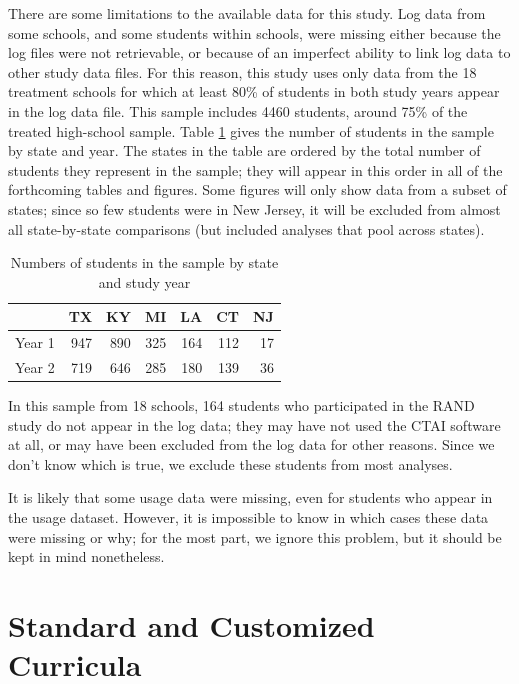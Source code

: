 \documentclass[12pt]{article}\usepackage[]{graphicx}\usepackage[]{color}
\begin{document}
There are some limitations to the available data for this study.
Log data from some schools, and some students within schools, were
missing either because the log files were not retrievable, or because
of an imperfect ability to link log data to other study data files.
For this reason, this study uses only data from the
18 treatment schools for which at least
80\%
of students in both study years appear in the log data file.
This sample includes 4460 students, around
75\%
of the treated high-school sample.
Table \ref{tab:nByState} gives the number of students in the sample by
state and year.
The states in the table are ordered by the total number of students
they represent in the sample; they will appear in this order in
all of the forthcoming tables and figures.
Some figures will only show data from a subset of states; since so few
students were in New Jersey, it will be excluded from almost all
state-by-state comparisons (but included analyses that pool across states).
\begin{table}[ht]
\centering
\begin{tabular}{rrrrrrr}
  \hline
 & TX & KY & MI & LA & CT & NJ \\ 
  \hline
Year 1 & 947 & 890 & 325 & 164 & 112 &  17 \\ 
  Year 2 & 719 & 646 & 285 & 180 & 139 &  36 \\ 
   \hline
\end{tabular}
\caption{Numbers of students in the sample by state and study year} 
\label{tab:nByState}
\end{table}


In this sample from 18 schools, 164
students who participated in the RAND study do not appear in the log data; they may have not used the CTAI
software at all, or may have been excluded from the log data for other
reasons.
Since we don't know which is true, we exclude these students from most
analyses.

It is likely that some usage data were missing, even for students who
appear in the usage dataset.
However, it is impossible to know in which cases these data were
missing or why; for the most part, we ignore this problem, but it
should be kept in mind nonetheless.

\section{Standard and Customized Curricula}\label{sec:curricula}
\end{document}

